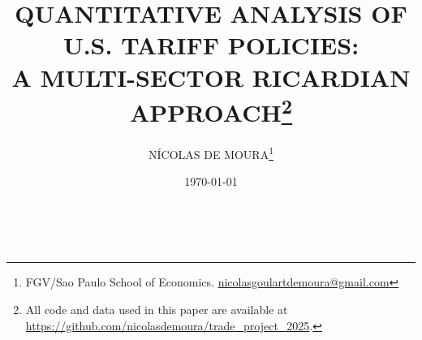 \documentclass[a4paper, 12pt]{article}
\begin{document}
\title{\normalsize\MakeUppercase{\bfseries 
 Quantitative Analysis of U.S. Tariff Policies:\\A Multi-Sector Ricardian Approach}\footnote{All code and data used in this paper are available at \url{https://github.com/nicolasdemoura/trade_project_2025}.}}
\date{\footnotesize\MakeUppercase\today}
\author{
    \small\MakeUppercase{Nícolas de Moura}\footnote{FGV/Sao Paulo School of Economics. \href{mailto:nicolasgoulartdemoura@gmail.com}{nicolasgoulartdemoura@gmail.com}}
}
\maketitle



\newpage
\
\newpage
\newpage


\newpage



\newpage



\end{document}
